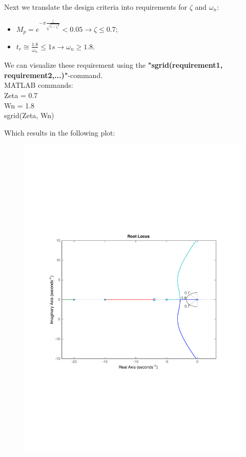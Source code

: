 \begin{frame}
	\begin{exampleblock}{}
		Next we translate the design criteria into requirements for $\zeta$ and $\omega_n$:
		\begin{itemize}
			\item $M_p = e^{-\pi \frac{\zeta}{\sqrt{1 - \zeta^2}}} < 0.05 \rightarrow \zeta \leq 0.7$;
			\item $t_r \cong \frac{1.8}{\omega_n} \leq 1s \rightarrow \omega_n \geq 1.8$.
		\end{itemize}
		\vspace{1em}
		We can visualize these requirement using the \textbf{"sgrid(requirement1, requirement2,...)"}-command.\\
		\vspace{1em}
		MATLAB commands:\\
		Zeta = 0.7\\
		Wn = 1.8\\
		sgrid(Zeta, Wn)\\
	\end{exampleblock}
\end{frame}

\begin{frame}
	\begin{exampleblock}{}
		Which results in the following plot:
		\vspace{-0.5em}
		\begin{figure}
			\centering
			\includegraphics[width=0.7\linewidth]{matlab_ex2}
		\end{figure}
	\end{exampleblock}
\end{frame}

